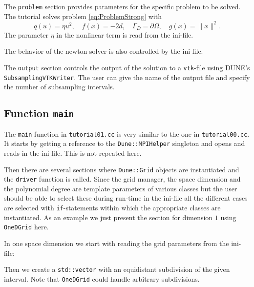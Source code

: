 \documentclass[a4paper,12pt]{article}
\begin{document}

The \lstinline{problem} section provides parameters for the
specific problem to be solved. The tutorial solves problem \eqref{eq:ProblemStrong}
with $$q(u)=\eta u^2, \quad f(x) = -2d, \quad \Gamma_D=\partial\Omega,
\quad g(x)=\|x\|^2 .$$
The parameter $\eta$ in the nonlinear term is read from the ini-file.

The behavior of the newton solver is also controlled by the ini-file.



The \lstinline{output} section controls the output of the solution
to a \lstinline{vtk}-file using DUNE's \lstinline{SubsamplingVTKWriter}.
The user can give the name of the output file and specify the number of subsampling intervals.



\subsection{Function \lstinline{main}}

The \lstinline{main} function  in \lstinline{tutorial01.cc} is very similar to the one
in \lstinline{tutorial00.cc}. It starts by getting a reference to the
\lstinline{Dune::MPIHelper} singleton and opens and reads in the ini-file. 
This is not repeated here.

Then there are several sections where \lstinline{Dune::Grid} objects are instantiated
and the \lstinline{driver} function is called. Since the grid manager, the space
dimension and the polynomial degree are template parameters of various classes
but the user should be able to select these during run-time in the ini-file all 
the different cases are selected with \lstinline{if}-statements within which
the appropriate classes are instantiated. As an example we just
present the section for dimension $1$ using \lstinline{OneDGrid} here.

In one space dimension we start with reading the grid parameters 
from the ini-file:


Then we create a \lstinline{std::vector} with an equidistant
subdivision of the given interval. Note that \lstinline{OneDGrid}
could handle arbitrary subdivisions.

\end{document}
